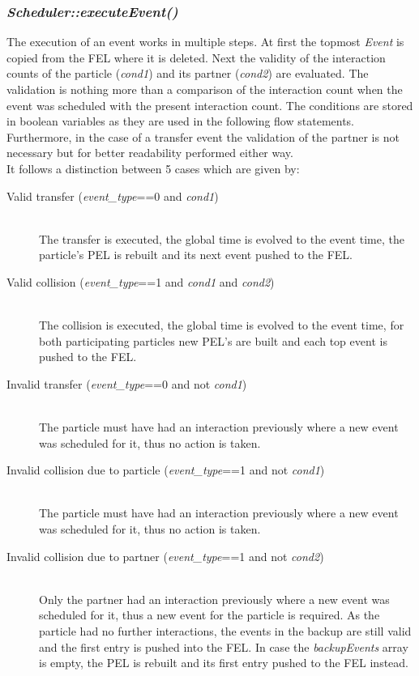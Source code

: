 \subsubsection{\quad \textit{Scheduler::executeEvent()}}
The execution of an event works in multiple steps. At first the topmost \textit{Event} is copied from the FEL where it is deleted. Next the validity of the interaction counts of the particle (\textit{cond1}) and its partner (\textit{cond2}) are evaluated. The validation is nothing more than a comparison of the interaction count when the event was scheduled with the present interaction count. The conditions are stored in boolean variables as they are used in the following flow statements. Furthermore, in the case of a transfer event the validation of the partner is not necessary but for better readability performed either way.\\
It follows a distinction between 5 cases which are given by:
\begin{description}
\item[Valid transfer (\textit{event\_type}==0 and \textit{cond1}) ] \hfill \\ The transfer is executed, the global time is evolved to the event time, the particle's PEL is rebuilt and its next event pushed to the FEL.
\item[Valid collision (\textit{event\_type}==1 and \textit{cond1} and \textit{cond2}) ]\hfill \\ The collision is executed, the global time is evolved to the event time, for both participating particles new PEL's are built and each top event is pushed to the FEL.
\item[Invalid transfer (\textit{event\_type}==0 and not \textit{cond1})] \hfill \\ The particle must have had an interaction previously where a new event was scheduled for it, thus no action is taken.
\item[Invalid collision due to particle (\textit{event\_type}==1 and not \textit{cond1})] \hfill \\  The particle must have had an interaction previously where a new event was scheduled for it, thus no action is taken.
\item[Invalid collision due to partner (\textit{event\_type}==1 and not \textit{cond2})] \hfill \\  Only the partner had an interaction previously where a new event was scheduled for it, thus a new event for the particle is required. As the particle had no further interactions, the events in the backup are still valid and the first entry is pushed into the FEL. In case the \textit{backupEvents} array is empty, the PEL is rebuilt and its first entry pushed to the FEL instead.
\end{description}

